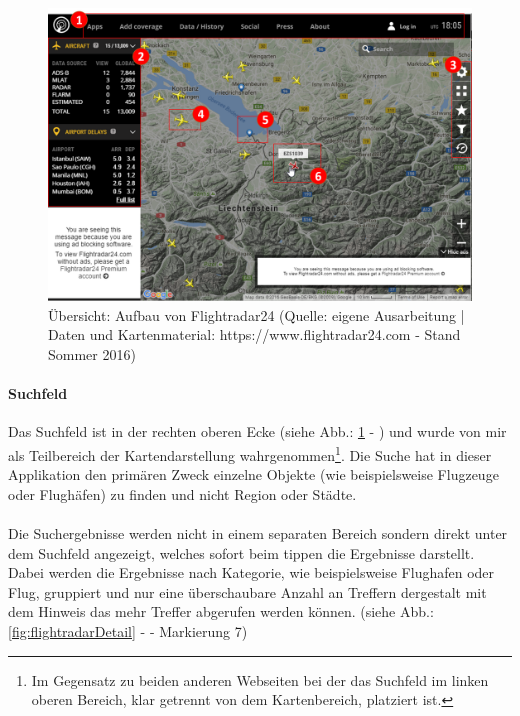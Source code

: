 \documentclass[../Bachelorarbeit.tex]{subfiles}
\begin{document}
\begin{figure}[H]
\centering
\includegraphics[width=1\linewidth]{img/StandDerTechnik/flightradarOverview}
\caption[Übersicht: Aufbau von Flightradar24]{Übersicht: Aufbau von Flightradar24 (Quelle: eigene Ausarbeitung | Daten und Kartenmaterial: https://www.flightradar24.com - Stand Sommer 2016)}
\label{fig:flightradarOverview}
\end{figure}

\paragraph{Suchfeld}
Das Suchfeld ist in der rechten oberen Ecke (siehe Abb.: \ref{fig:flightradarOverview} - ) und wurde von mir als Teilbereich der Kartendarstellung wahrgenommen\footnote{Im Gegensatz zu beiden anderen Webseiten bei der das Suchfeld im linken oberen Bereich, klar getrennt von dem Kartenbereich, platziert ist.}. 
Die Suche hat in dieser Applikation den primären Zweck einzelne Objekte (wie beispielsweise Flugzeuge oder Flughäfen) zu finden und nicht Region oder Städte.\\
\\
Die Suchergebnisse werden nicht in einem separaten Bereich sondern direkt unter dem Suchfeld angezeigt, welches sofort beim tippen die Ergebnisse darstellt.  
Dabei werden die Ergebnisse nach Kategorie, wie beispielsweise Flughafen oder Flug, gruppiert und nur eine überschaubare Anzahl an Treffern dergestalt mit dem Hinweis das mehr Treffer abgerufen werden können.
(siehe Abb.: \ref{fig:flightradarDetail} -  - Markierung 7)
\end{document}
